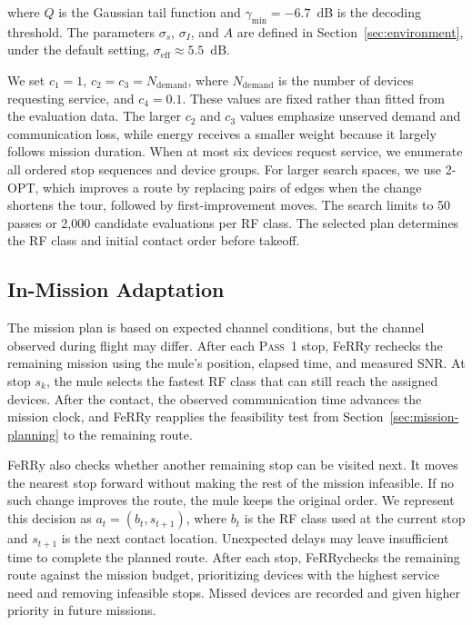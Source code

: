 \documentclass[conference]{IEEEtran}
\newcommand{\sysname}{FeRRy}
\begin{document}
where $Q$ is the Gaussian tail function and
$\gamma_{\min}=-6.7$~dB is the decoding threshold. The parameters
$\sigma_s$, $\sigma_I$, and $A$ are defined in
Section~\ref{sec:environment}, under the default setting,
$\sigma_{\mathrm{eff}}\approx5.5$~dB.

We set $c_1=1$, $c_2=c_3=N_{\mathrm{demand}}$, where
$N_{\mathrm{demand}}$ is the number of devices requesting service, and
$c_4=0.1$. These values are fixed rather than fitted from the evaluation data.
The larger $c_2$ and $c_3$ values emphasize
unserved demand and communication loss, while energy receives a smaller weight
because it largely follows mission duration. When at most six devices request service, we enumerate all ordered stop
sequences and device groups. For larger search spaces, we use 2-OPT, which improves a route by
replacing pairs of edges when the change shortens the tour, followed by
first-improvement moves. The search limits to 50 passes or 2,000
candidate evaluations per RF class. The selected plan determines the RF
class and initial contact order before takeoff.

\subsection{In-Mission Adaptation}
\label{sec:inmission}

The mission plan is based on expected channel conditions, but the channel
observed during flight may differ. After each \textsc{Pass~1} stop, \sysname{} rechecks the remaining
mission using the mule's position, elapsed time, and measured SNR. At stop $s_k$, the mule selects the fastest RF class that can still reach the assigned
devices. After the contact, the observed communication time
advances the mission clock, and \sysname{} reapplies the feasibility test from
Section~\ref{sec:mission-planning} to the remaining route.

\sysname{} also checks whether another remaining stop can be visited next. It
moves the nearest stop forward without making the rest of
the mission infeasible. If no such change improves the route, the mule keeps the
original order. We represent this decision as $a_t=(b_t,s_{t+1})$, where $b_t$ is the RF class used at the current stop and $s_{t+1}$ is the next
contact location. Unexpected delays may leave insufficient time to complete the planned route. After each stop, \sysname checks the remaining route against the mission budget, prioritizing devices with the highest service need and removing infeasible stops. Missed devices are recorded and given higher priority in future missions.
\end{document}
